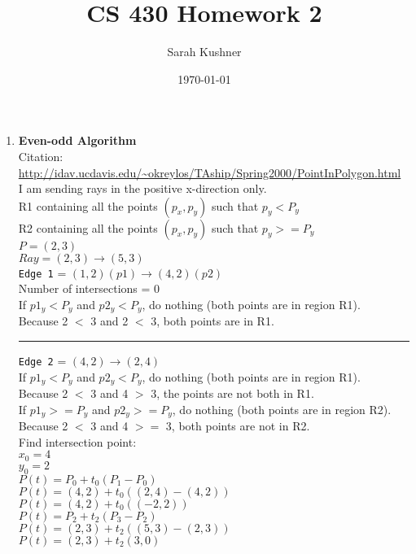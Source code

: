 \documentclass[12pt]{article}
\begin{document}
\title{CS 430 Homework 2}
\author{Sarah Kushner}
\date{\today}
\maketitle

\begin{enumerate}

\item 
\textbf{Even-odd Algorithm} \\

Citation: \url{http://idav.ucdavis.edu/~okreylos/TAship/Spring2000/PointInPolygon.html} \\
I am sending rays in the positive x-direction only. \\
R1 containing all the points $(p_x, p_y)$ such that $p_y < P_y$ \\ 
R2 containing all the points $(p_x, p_y)$ such that $p_y >= P_y$ \\

$P = (2,3)$ \\
$Ray = (2,3) \rightarrow (5,3)$ \\

\texttt{Edge 1} = $(1,2) (p1) \rightarrow (4,2) (p2)$ \\

Number of intersections = 0 \\

If $p1_y < P_y$ and $p2_y < P_y$, do nothing (both points are in region R1). \\
Because 2 $<$ 3 and 2 $<$ 3, both points are in R1. \\


\rule{\textwidth}{1pt}

\texttt{Edge 2} = $(4,2) \rightarrow (2,4)$ \\

If $p1_y < P_y$ and $p2_y < P_y$, do nothing (both points are in region R1). \\
Because 2 $<$ 3 and 4 $>$ 3, the points are not both in R1. \\
If $p1_y >= P_y$ and $p2_y >= P_y$, do nothing (both points are in region R2). \\
Because 2 $<$ 3 and 4 $>=$ 3, both points are not in R2. \\

Find intersection point: \\
	$x_0 = 4$ \\
	$y_0 = 2$ \\ 

	$P(t) = P_0 + t_0(P_1 - P_0)$ \\
	$P(t) = (4,2) + t_0((2,4) - (4,2))$ \\
	$P(t) = (4,2) + t_0((-2,2))$ \\ 	
	$P(t) = P_2 + t_2(P_3 - P_2)$ \\
	$P(t) = (2,3) + t_2((5,3) - (2,3))$ \\
	$P(t) = (2,3) + t_2(3,0)$ \\ 
	

\end{enumerate}
\end{document}
